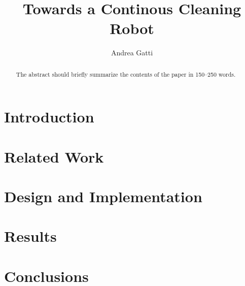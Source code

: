 \documentclass[runningheads]{llncs}
\title{Towards a Continous Cleaning Robot}
\author{Andrea Gatti\orcidID{0009-0003-0992-4058}}
\institute{University of Genoa}
\begin{document}
	\maketitle

	\begin{abstract}
		The abstract should briefly summarize the contents of the paper in 150--250 words.

	\end{abstract}

	\section{Introduction}
	

	\section{Related Work}
	

	\section{Design and Implementation}
	

	\section{Results}
	

	\section{Conclusions}
	
\end{document}

